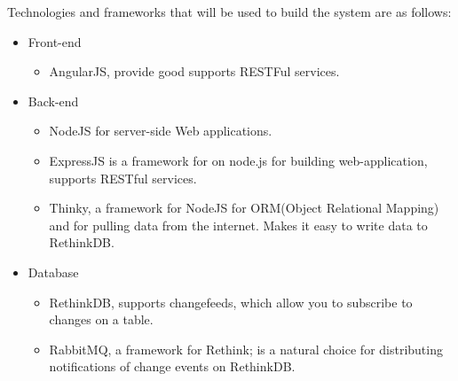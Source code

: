 Technologies and frameworks that will be used to build the system are as follows:
\begin{itemize}
\item Front-end
\begin{itemize}
	\item AngularJS, provide good supports RESTFul services.
\end{itemize}
\item Back-end
\begin{itemize}
	\item NodeJS for server-side Web applications.
	\item ExpressJS is a framework for on node.js for building web-application, supports RESTful services.
	\item Thinky, a framework for NodeJS for ORM(Object Relational Mapping) and for pulling data from the internet. Makes it easy to write data to RethinkDB.
\end{itemize}
\item Database
\begin{itemize}
	\item RethinkDB, supports changefeeds, which allow you to subscribe to changes on a table.
	\item RabbitMQ, a framework for Rethink; is a natural choice for distributing notifications of change events on RethinkDB.
\end{itemize}

\end{itemize}
